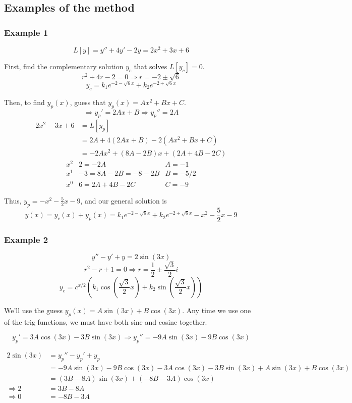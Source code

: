 \documentclass[11pt]{article}
\begin{document}
\subsection{Examples of the method}
\subsubsection{Example 1}
	$$ L[y] = y'' + 4y' - 2y = 2x^2 + 3x + 6 $$

	First, find the complementary solution $y_c$ that solves $L[y_c] = 0$.
		$$ r^2 + 4r - 2 = 0 \Rightarrow r = -2 \pm \sqrt{6} $$
		$$ y_c = k_1 e^{-2 - \sqrt{6} x} + k_2 e^{-2 + \sqrt{6} x} $$

	Then, to find $y_p(x)$, guess that $y_p(x) = Ax^2 + Bx + C$.
		$$ \Rightarrow y_p' = 2Ax + B \Rightarrow y_p'' = 2A $$
		\begin{align*}
			2x^2 - 3x + 6 &= L[y_p] \\
				&= 2A + 4(2Ax + B) - 2(Ax^2 + Bx + C) \\
				&= -2Ax^2 + (8A-2B)x + (2A + 4B -2C)
		\end{align*}
		$$ \begin{array}{c|c|l}
			x^2 & 2 = -2 A & A = -1 \\
			x^1 & -3 = 8A - 2B = -8 - 2B & B = -5/2 \\
			x^0 & 6 = 2A + 4B - 2C & C = -9
		\end{array} $$

	Thus, $y_p = -x^2 - \frac{5}{2} x - 9$, and our general solution is
		$$ y(x) = y_c (x) + y_p(x) = k_1 e^{-2 - \sqrt{6} x} + k_2 e^{-2 + \sqrt{6} x} -x^2 - \frac{5}{2} x - 9 $$

\subsubsection{Example 2}
		$$ y'' - y' + y = 2 \sin(3x) $$
		$$ r^2 - r + 1 = 0 \Rightarrow r = \frac{1}{2} \pm \frac{\sqrt{3}}{2} i $$
		$$ y_c = c^{x/2} (k_1 \cos(\frac{\sqrt{3}}{2}x) + k_2 \sin(\frac{\sqrt{3}}{2} x)) $$

	We'll use the guess $y_p(x) = A \sin(3x) + B \cos(3x)$. Any time we use one of the trig functions, we must have both sine and cosine together.

		$$ y_p' = 3A \cos(3x) - 3B \sin(3x) \Rightarrow y_p'' = -9A \sin(3x) - 9B \cos(3x) $$

	\begin{align*}
		2\sin(3x) &= y_p'' - y_p' + y_p \\
			&= -9A \sin(3x) - 9B \cos(3x) -3A \cos(3x) - 3B \sin(3x) + A \sin(3x) + B \cos(3x) \\
			&= (3B - 8A) \sin(3x) + (-8B - 3A) \cos(3x) \\
		\Rightarrow 2 &= 3B - 8A \\
		\Rightarrow 0 &= -8B - 3A
	\end{align*}
\end{document}

